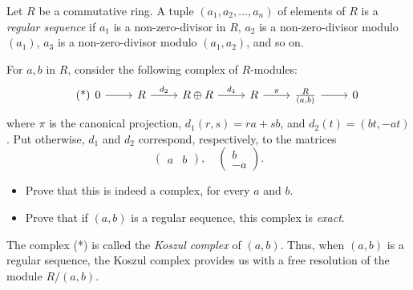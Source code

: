 \documentclass[../../master.tex]{subfiles}
\begin{document}
\begin{problem}
    Let $R$ be a commutative ring.
    A tuple $(a_1, a_2, \ldots, a_n)$ of elements of $R$ is a \textit{regular sequence} if $a_1$ is a non-zero-divisor in $R$, $a_2$ is a non-zero-divisor modulo $(a_1)$, $a_3$ is a non-zero-divisor modulo $(a_1, a_2)$, and so on.

    For $a, b$ in $R$, consider the following complex of $R$-modules:
    \[
        \tag{*}
        \begin{tikzcd}
            0 & R & R \oplus R & R & \frac{R}{(a, b)} & 0
            \arrow[from=1-1, to=1-2] 
            \arrow[from=1-2, to=1-3, "d_2"] 
            \arrow[from=1-3, to=1-4, "d_1"]
            \arrow[from=1-4, to=1-5, "\pi"]
            \arrow[from=1-5, to=1-6] 
        \end{tikzcd}
    \]
    where $\pi$ is the canonical projection, $d_1(r, s) = ra + sb$, and $d_2(t) = (bt, -at)$.
    Put otherwise, $d_1$ and $d_2$ correspond, respectively, to the matrices
    \[
    \begin{pmatrix}
        a & b
    \end{pmatrix}, \quad
    \begin{pmatrix}
        b \\
        -a
    \end{pmatrix}.
    \]
    \begin{itemize}
        \item Prove that this is indeed a complex, for every $a$ and $b$.
        \item Prove that if $(a, b)$ is a regular sequence, this complex is \textit{exact}.
    \end{itemize}
    The complex (*) is called the \textit{Koszul complex} of $(a, b)$.
    Thus, when $(a, b)$ is a regular sequence, the Koszul complex provides us with a free resolution of the module $R / (a,b)$.
\end{problem}
\end{document}
